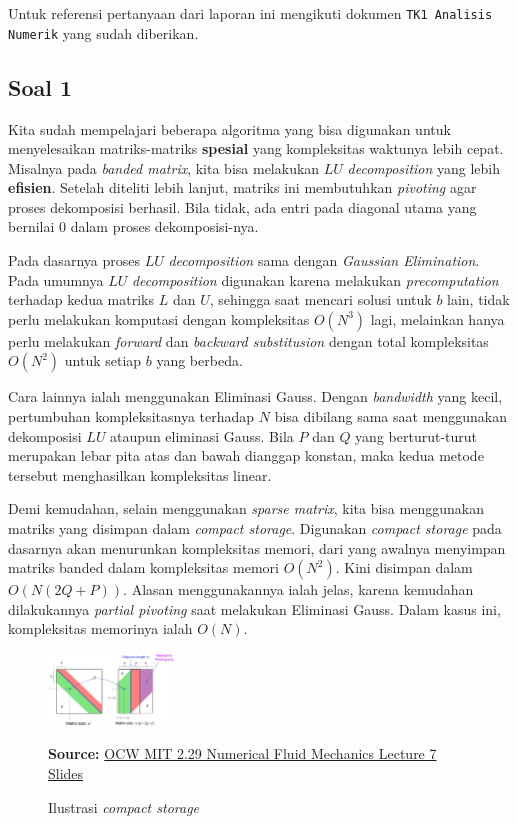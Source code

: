 \documentclass[10pt, a4paper, onecolumn, oneside, final]{report}
\begin{document}
Untuk referensi pertanyaan dari laporan ini mengikuti dokumen \texttt{TK1 Analisis Numerik} yang sudah diberikan.

\subsection*{Soal 1}

Kita sudah mempelajari beberapa algoritma yang bisa digunakan untuk menyelesaikan matriks-matriks \textbf{spesial} yang kompleksitas waktunya lebih cepat. Misalnya pada \textit{banded matrix}, kita bisa melakukan $LU$ \textit{decomposition} yang lebih \textbf{efisien}. Setelah diteliti lebih lanjut, matriks ini membutuhkan \textit{pivoting} agar proses dekomposisi berhasil. Bila tidak, ada entri pada diagonal utama yang bernilai $0$ dalam proses dekomposisi-nya.

Pada dasarnya proses $LU$ \textit{decomposition} sama dengan \textit{Gaussian Elimination}. Pada umumnya $LU$ \textit{decomposition} digunakan karena melakukan \textit{precomputation} terhadap kedua matriks $L$ dan $U$, sehingga saat mencari solusi untuk $b$ lain, tidak perlu melakukan komputasi dengan kompleksitas $O(N^3)$ lagi, melainkan hanya perlu melakukan \textit{forward} dan \textit{backward substitusion} dengan total kompleksitas $O(N^2)$ untuk setiap $b$ yang berbeda.

Cara lainnya ialah menggunakan Eliminasi Gauss. Dengan \textit{bandwidth} yang kecil, pertumbuhan kompleksitasnya terhadap $N$ bisa dibilang sama saat menggunakan dekomposisi $LU$ ataupun eliminasi Gauss. Bila $P$ dan $Q$ yang berturut-turut merupakan lebar pita atas dan bawah dianggap konstan, maka kedua metode tersebut menghasilkan kompleksitas linear.

Demi kemudahan, selain menggunakan \textit{sparse matrix}, kita bisa menggunakan matriks yang disimpan dalam \textit{compact storage}. Digunakan \textit{compact storage} pada dasarnya akan menurunkan kompleksitas memori, dari yang awalnya menyimpan matriks banded dalam kompleksitas memori $O(N^2)$. Kini disimpan dalam $O(N(2Q + P))$. Alasan menggunakannya ialah jelas, karena kemudahan dilakukannya \textit{partial pivoting} saat melakukan Eliminasi Gauss. Dalam kasus ini, kompleksitas memorinya ialah $O(N)$.

\begin{figure}[h]
  \centering
    \includegraphics[width=0.3\textwidth]{assets/Compact.png}
  \caption{Ilustrasi \textit{compact storage}}
  \textbf{Source:}  \href{https://ocw.mit.edu/courses/mechanical-engineering/2-29-numerical-fluid-mechanics-spring-2015/lecture-notes-and-references/MIT2_29S15_Lecture7.pdf}{OCW MIT 2.29 Numerical Fluid Mechanics Lecture 7 Slides}
\end{figure}
\end{document}
